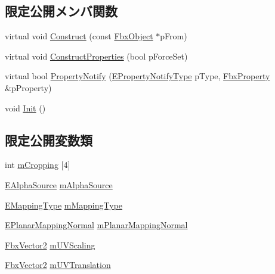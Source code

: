 \subsection*{限定公開メンバ関数}
\begin{DoxyCompactItemize}
\item 
virtual void \hyperlink{class_fbx_texture_afc81141345bc807a77dcbd9d6a0d8356}{Construct} (const \hyperlink{class_fbx_object}{Fbx\+Object} $\ast$p\+From)
\item 
virtual void \hyperlink{class_fbx_texture_a851d5c4c96fb5023c004c88aeab2275b}{Construct\+Properties} (bool p\+Force\+Set)
\item 
virtual bool \hyperlink{class_fbx_texture_af45140c7eecc9b2e133d7ee8a63fd5f5}{Property\+Notify} (\hyperlink{class_fbx_object_a528f1b2c2b7abbd64c525ba3a9a496b8}{E\+Property\+Notify\+Type} p\+Type, \hyperlink{class_fbx_property}{Fbx\+Property} \&p\+Property)
\item 
void \hyperlink{class_fbx_texture_a2e0e1f9bca241abf56d471168a93c5fc}{Init} ()
\end{DoxyCompactItemize}
\subsection*{限定公開変数類}
\begin{DoxyCompactItemize}
\item 
int \hyperlink{class_fbx_texture_abba1ab39aa33baa722b9707363d80b44}{m\+Cropping} \mbox{[}4\mbox{]}
\item 
\hyperlink{class_fbx_texture_a12777ea406718d186e21b9656716171d}{E\+Alpha\+Source} \hyperlink{class_fbx_texture_a2d708745702a77f5f47e6d65763923fb}{m\+Alpha\+Source}
\item 
\hyperlink{class_fbx_texture_afdf9b65a25dfe5bdcef820f0fc1f5b34}{E\+Mapping\+Type} \hyperlink{class_fbx_texture_aed526c6181680a2b7da6eae7c8723a6d}{m\+Mapping\+Type}
\item 
\hyperlink{class_fbx_texture_a6115b6970e4c83198112530d1e6f578c}{E\+Planar\+Mapping\+Normal} \hyperlink{class_fbx_texture_a5c9ac7b29bd18735d46d681cc2031e2a}{m\+Planar\+Mapping\+Normal}
\item 
\hyperlink{class_fbx_vector2}{Fbx\+Vector2} \hyperlink{class_fbx_texture_a44b35867b77a61b184302c508b2249a5}{m\+U\+V\+Scaling}
\item 
\hyperlink{class_fbx_vector2}{Fbx\+Vector2} \hyperlink{class_fbx_texture_a7465889be9ff81770ca74471bd86f94d}{m\+U\+V\+Translation}
\end{DoxyCompactItemize}
